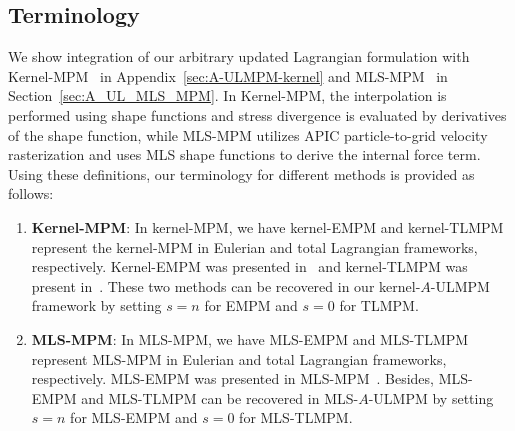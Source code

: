 \subsection{Terminology}
We show integration of our arbitrary updated Lagrangian formulation with Kernel-MPM~\cite{Stomakhin:2013:MPMsnow} in Appendix~\ref{sec:A-ULMPM-kernel} and MLS-MPM~\cite{Hu:2018:Moving} in Section~\ref{sec:A_UL_MLS_MPM}. In Kernel-MPM, the interpolation is performed using shape functions and stress divergence is evaluated by derivatives of the shape function, while MLS-MPM utilizes APIC particle-to-grid velocity rasterization and uses MLS shape functions to derive the internal force term. Using these definitions, our terminology for different methods is provided as follows:
\begin{enumerate}
    \item {\textbf{Kernel-MPM}:}
    In kernel-MPM, we have kernel-EMPM and kernel-TLMPM represent the kernel-MPM in Eulerian and total Lagrangian frameworks, respectively. Kernel-EMPM was presented in~\cite{Stomakhin:2013:MPMsnow} and kernel-TLMPM was present in~\cite{De:2020:TLMPM}. These two methods can be recovered in our kernel-$A$-ULMPM framework by setting $s=n$ for EMPM and $s=0$ for TLMPM. 
    \item{\textbf{MLS-MPM}:}
    In MLS-MPM, we have MLS-EMPM and MLS-TLMPM represent MLS-MPM in Eulerian and total Lagrangian frameworks, respectively. 
    MLS-EMPM was presented in MLS-MPM~\cite{Hu:2018:Moving}.
    Besides, MLS-EMPM and MLS-TLMPM can be recovered in MLS-$A$-ULMPM by setting $s=n$ for MLS-EMPM and $s=0$ for MLS-TLMPM. 
\end{enumerate}
